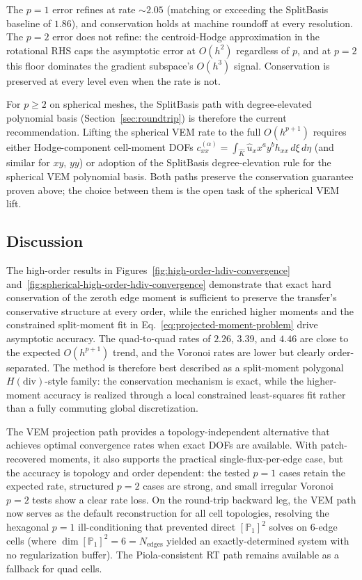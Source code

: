 \documentclass[11pt]{article}
\begin{document}
The \(p=1\) error refines at rate \(\sim\!2.05\) (matching or exceeding the
SplitBasis baseline of \(1.86\)), and conservation holds at machine
roundoff at every resolution.  The \(p=2\) error does not refine: the
centroid-Hodge approximation in the rotational RHS caps the asymptotic
error at \(O(h^2)\) regardless of \(p\), and at \(p=2\) this floor
dominates the gradient subspace's \(O(h^3)\) signal.  Conservation is
preserved at every level even when the rate is not.

For \(p\ge2\) on spherical meshes, the SplitBasis path with
degree-elevated polynomial basis (Section~\ref{sec:roundtrip}) is
therefore the current recommendation.  Lifting the spherical VEM rate
to the full \(O(h^{p+1})\) requires either Hodge-component cell-moment
DOFs \(c_{xx}^{(\alpha)}=\int_{\hat K}\hat u_x x^a y^b h_{xx}\,d\xi\,d\eta\)
(and similar for \(xy\), \(yy\)) or adoption of the SplitBasis
degree-elevation rule for the spherical VEM polynomial basis.  Both
paths preserve the conservation guarantee proven above; the choice
between them is the open task of the spherical VEM lift.

\subsection{Discussion}

The high-order results in Figures~\ref{fig:high-order-hdiv-convergence}
and~\ref{fig:spherical-high-order-hdiv-convergence} demonstrate that exact hard
conservation of the zeroth edge moment is sufficient to preserve the transfer's
conservative structure at every order, while the enriched higher moments and the
constrained split-moment fit in Eq.~\eqref{eq:projected-moment-problem} drive
asymptotic accuracy.  The quad-to-quad rates of \(2.26\), \(3.39\), and
\(4.46\) are close to the expected \(O(h^{p+1})\) trend, and the Voronoi rates
are lower but clearly order-separated.  The method is therefore best described
as a split-moment polygonal \(H(\mathrm{div})\)-style family: the conservation
mechanism is exact, while the higher-moment accuracy is realized through a
local constrained least-squares fit rather than a fully commuting global
discretization.

The VEM projection path provides a topology-independent alternative that
achieves optimal convergence rates when exact DOFs are available.  With
patch-recovered moments, it also supports the practical single-flux-per-edge
case, but the accuracy is topology and order dependent: the tested \(p=1\)
cases retain the expected rate, structured \(p=2\) cases are strong, and small
irregular Voronoi \(p=2\) tests show a clear rate loss.  On the round-trip
backward leg, the VEM path now serves as the default reconstruction for all cell
topologies, resolving the hexagonal \(p=1\) ill-conditioning that prevented
direct \([\mathbb{P}_1]^2\) solves on 6-edge cells (where
\(\dim[\mathbb{P}_1]^2=6=N_{\text{edges}}\) yielded an exactly-determined system
with no regularization buffer).  The Piola-consistent RT path remains available
as a fallback for quad cells.
\end{document}
